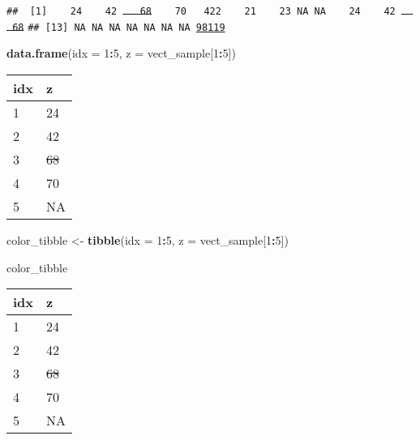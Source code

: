 \documentclass[
]{article}
\newenvironment{Shaded}{\begin{snugshade}}{\end{snugshade}}
\newcommand{\DataTypeTok}[1]{\textcolor[rgb]{0.13,0.29,0.53}{#1}}
\newcommand{\DecValTok}[1]{\textcolor[rgb]{0.00,0.00,0.81}{#1}}
\newcommand{\KeywordTok}[1]{\textcolor[rgb]{0.13,0.29,0.53}{\textbf{#1}}}
\newcommand{\NormalTok}[1]{#1}
\newcommand{\OperatorTok}[1]{\textcolor[rgb]{0.81,0.36,0.00}{\textbf{#1}}}
\newcommand{\StringTok}[1]{\textcolor[rgb]{0.31,0.60,0.02}{#1}}
\begin{document}
\texttt{\#\#\ \ [1]\ \colorbox[rgb]{0.0,0.0,1.0}{\textcolor[rgb]{1.0,0.0,0.0}{\ \ \ 24}}\ \colorbox[rgb]{1.0,1.0,0.0}{\ \ \ 42}\ \sout{\textcolor[rgb]{1.0,0.0,1.0}{\ \ \ 68}}\ \textcolor[rgb]{0.0,1.0,0.0}{\ \ \ 70}\ \ \ 422\ \ \ \ 21\ \ \ \ 23\ NA\ NA\ \colorbox[rgb]{0.0,0.0,1.0}{\textcolor[rgb]{1.0,0.0,0.0}{\ \ \ 24}}\ \colorbox[rgb]{1.0,1.0,0.0}{\ \ \ 42}\ \sout{\textcolor[rgb]{1.0,0.0,1.0}{\ \ \ 68}}}\newline
\texttt{\#\#\ [13]\ NA\ NA\ NA\ NA\ NA\ NA\ NA\ \colorbox[rgb]{0.0,0.0,1.0}{\underline{\textcolor[rgb]{1.0,1.0,0.0}{98119}}}}\newline

\begin{Shaded}
\begin{Highlighting}[]
\KeywordTok{data.frame}\NormalTok{(}\DataTypeTok{idx =} \DecValTok{1}\OperatorTok{:}\DecValTok{5}\NormalTok{, }\DataTypeTok{z =}\NormalTok{ vect_sample[}\DecValTok{1}\OperatorTok{:}\DecValTok{5}\NormalTok{])}
\end{Highlighting}
\end{Shaded}

\begin{longtable}[]{@{}ll@{}}
\toprule
idx & z\tabularnewline
\midrule
\endhead
1 &
\colorbox[rgb]{0.0,0.0,1.0}{\textcolor[rgb]{1.0,0.0,0.0}{24}}\tabularnewline
2 & \colorbox[rgb]{1.0,1.0,0.0}{42}\tabularnewline
3 & \sout{\textcolor[rgb]{1.0,0.0,1.0}{68}}\tabularnewline
4 & \textcolor[rgb]{0.0,1.0,0.0}{70}\tabularnewline
5 & NA\tabularnewline
\bottomrule
\end{longtable}

\begin{Shaded}
\begin{Highlighting}[]
\NormalTok{color_tibble <-}\StringTok{ }\KeywordTok{tibble}\NormalTok{(}\DataTypeTok{idx =} \DecValTok{1}\OperatorTok{:}\DecValTok{5}\NormalTok{, }\DataTypeTok{z =}\NormalTok{ vect_sample[}\DecValTok{1}\OperatorTok{:}\DecValTok{5}\NormalTok{]) }

\NormalTok{color_tibble}
\end{Highlighting}
\end{Shaded}

\begin{longtable}[]{@{}ll@{}}
\toprule
idx & z\tabularnewline
\midrule
\endhead
1 &
\colorbox[rgb]{0.0,0.0,1.0}{\textcolor[rgb]{1.0,0.0,0.0}{24}}\tabularnewline
2 & \colorbox[rgb]{1.0,1.0,0.0}{42}\tabularnewline
3 & \sout{\textcolor[rgb]{1.0,0.0,1.0}{68}}\tabularnewline
4 & \textcolor[rgb]{0.0,1.0,0.0}{70}\tabularnewline
5 & NA\tabularnewline
\bottomrule
\end{longtable}
\end{document}
